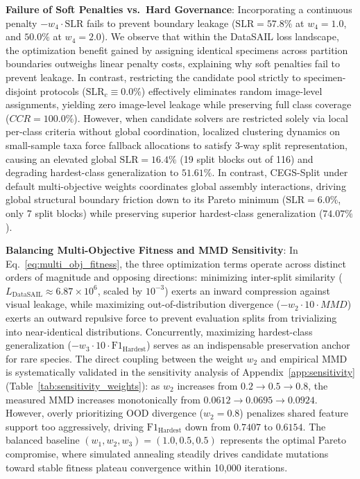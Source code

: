 \documentclass[a4paper,fleqn]{cas-sc}
\begin{document}
\textbf{Failure of Soft Penalties vs.\ Hard Governance}: Incorporating a continuous penalty $-w_4 \cdot \mathrm{SLR}$ fails to prevent boundary leakage ($\mathrm{SLR} = 57.8\%$ at $w_4=1.0$, and $50.0\%$ at $w_4=2.0$). We observe that within the DataSAIL loss landscape, the optimization benefit gained by assigning identical specimens across partition boundaries outweighs linear penalty costs, explaining why soft penalties fail to prevent leakage. In contrast, restricting the candidate pool strictly to specimen-disjoint protocols ($\text{SLR}_c \equiv 0.0\%$) effectively eliminates random image-level assignments, yielding zero image-level leakage while preserving full class coverage ($CCR = 100.0\%$). However, when candidate solvers are restricted solely via local per-class criteria without global coordination, localized clustering dynamics on small-sample taxa force fallback allocations to satisfy 3-way split representation, causing an elevated global $\mathrm{SLR} = 16.4\%$ (19 split blocks out of 116) and degrading hardest-class generalization to $51.61\%$. In contrast, CEGS-Split under default multi-objective weights coordinates global assembly interactions, driving global structural boundary friction down to its Pareto minimum ($\mathrm{SLR} = 6.0\%$, only 7 split blocks) while preserving superior hardest-class generalization ($74.07\%$).

\textbf{Balancing Multi-Objective Fitness and MMD Sensitivity}: In Eq.~\eqref{eq:multi_obj_fitness}, the three optimization terms operate across distinct orders of magnitude and opposing directions: minimizing inter-split similarity ($L_{\text{DataSAIL}} \approx 6.87 \times 10^6$, scaled by $10^{-3}$) exerts an inward compression against visual leakage, while maximizing out-of-distribution divergence ($-w_2 \cdot 10 \cdot MMD$) exerts an outward repulsive force to prevent evaluation splits from trivializing into near-identical distributions. Concurrently, maximizing hardest-class generalization ($-w_3 \cdot 10 \cdot \mathrm{F1}_{\text{Hardest}}$) serves as an indispensable preservation anchor for rare species. The direct coupling between the weight $w_2$ and empirical MMD is systematically validated in the sensitivity analysis of Appendix~\ref{app:sensitivity} (Table~\ref{tab:sensitivity_weights}): as $w_2$ increases from $0.2 \to 0.5 \to 0.8$, the measured MMD increases monotonically from $0.0612 \to 0.0695 \to 0.0924$. However, overly prioritizing OOD divergence ($w_2=0.8$) penalizes shared feature support too aggressively, driving $\mathrm{F1}_{\text{Hardest}}$ down from $0.7407$ to $0.6154$. The balanced baseline $(w_1, w_2, w_3) = (1.0, 0.5, 0.5)$ represents the optimal Pareto compromise, where simulated annealing steadily drives candidate mutations toward stable fitness plateau convergence within 10,000 iterations.
\end{document}
